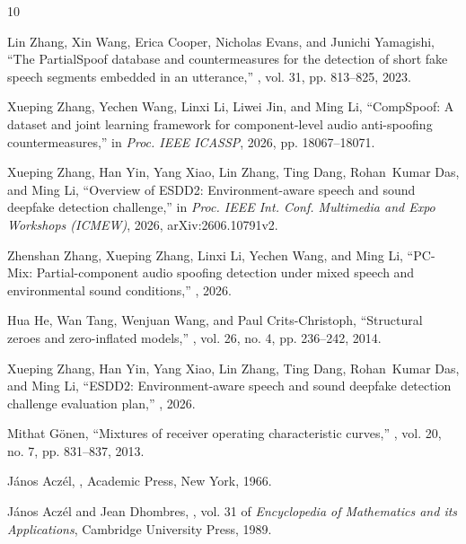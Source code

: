 \documentclass{article}
\begin{document}
\begin{thebibliography}{10}

Lin Zhang, Xin Wang, Erica Cooper, Nicholas Evans, and Junichi Yamagishi,
\newblock ``The {PartialSpoof} database and countermeasures for the detection of short fake speech segments embedded in an utterance,''
, vol. 31, pp. 813--825, 2023.

Xueping Zhang, Yechen Wang, Linxi Li, Liwei Jin, and Ming Li,
\newblock ``{CompSpoof}: A dataset and joint learning framework for component-level audio anti-spoofing countermeasures,''
\newblock in {\em Proc. IEEE ICASSP}, 2026, pp. 18067--18071.

Xueping Zhang, Han Yin, Yang Xiao, Lin Zhang, Ting Dang, Rohan~Kumar Das, and Ming Li,
\newblock ``Overview of {ESDD2}: Environment-aware speech and sound deepfake detection challenge,''
\newblock in {\em Proc. IEEE Int. Conf. Multimedia and Expo Workshops (ICMEW)}, 2026, arXiv:2606.10791v2.

Zhenshan Zhang, Xueping Zhang, Linxi Li, Yechen Wang, and Ming Li,
\newblock ``{PC-Mix}: Partial-component audio spoofing detection under mixed speech and environmental sound conditions,''
, 2026.

Hua He, Wan Tang, Wenjuan Wang, and Paul Crits-Christoph,
\newblock ``Structural zeroes and zero-inflated models,''
, vol. 26, no. 4, pp. 236--242, 2014.

Xueping Zhang, Han Yin, Yang Xiao, Lin Zhang, Ting Dang, Rohan~Kumar Das, and Ming Li,
\newblock ``{ESDD2}: Environment-aware speech and sound deepfake detection challenge evaluation plan,''
, 2026.

Mithat G\"{o}nen,
\newblock ``Mixtures of receiver operating characteristic curves,''
, vol. 20, no. 7, pp. 831--837, 2013.

J\'{a}nos Acz\'{e}l,
,
\newblock Academic Press, New York, 1966.

J\'{a}nos Acz\'{e}l and Jean Dhombres,
, vol. 31 of {\em Encyclopedia of Mathematics and its Applications},
\newblock Cambridge University Press, 1989.


\end{thebibliography}
\end{document}
